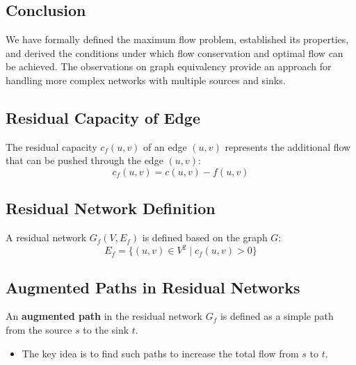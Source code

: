 \subsection{Conclusion}
\begin{summary}
    We have formally defined the maximum flow problem, established its properties, and derived the conditions under which flow conservation and optimal flow can be achieved. The observations on graph equivalency provide an approach for handling more complex networks with multiple sources and sinks.
\end{summary}

\subsection{Residual Capacity of Edge}
\begin{definition}
    The residual capacity $c_f(u, v)$ of an edge $(u, v)$ represents the additional flow that can be pushed through the edge $(u,v)$:
    \[
    c_f(u, v) = c(u, v) - f(u, v)
    \]
\end{definition}

\subsection{Residual Network Definition}
\begin{definition}
    A residual network $G_f(V, E_f)$ is defined based on the graph $G$:
    \[
    E_f = \{(u, v) \in V^2 \mid c_f(u, v) > 0\}
    \]
\end{definition}

\subsection{Augmented Paths in Residual Networks}
\begin{definition}
    An \textbf{augmented path} in the residual network $G_f$ is defined as a simple path from the source $s$ to the sink $t$. 
    \begin{itemize}
        \item The key idea is to find such paths to increase the total flow from $s$ to $t$.
    \end{itemize}
\end{definition}

